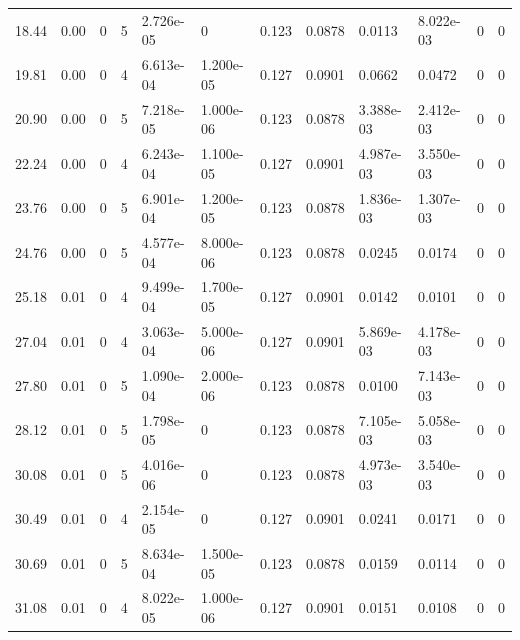 \documentclass[preview]{standalone}
\begin{document}
{{\begin{tabular}{L{1.2cm}C{1.2cm} C{0.3cm}C{0.5cm} C{1.4cm}C{1.4cm} C{1.4cm}C{1.4cm} C{1.6cm}C{1.6cm} C{1.6cm}C{1.6cm}}
  18.44  &  0.00  & 0     &  5 &  2.726e-05  & 0  &  0.123&   0.0878& 0.0113 & 8.022e-03   &  0 & 0  \\ 
  19.81  &  0.00  & 0     &  4 &  6.613e-04  & 1.200e-05  &  0.127&   0.0901& 0.0662 & 0.0472   &  0 & 0  \\ 
  20.90  &  0.00  & 0     &  5 &  7.218e-05  & 1.000e-06  &  0.123&   0.0878& 3.388e-03 & 2.412e-03   &  0 & 0  \\ 
  22.24  &  0.00  & 0     &  4 &  6.243e-04  & 1.100e-05  &  0.127&   0.0901& 4.987e-03 & 3.550e-03   &  0 & 0  \\ 
  23.76  &  0.00  & 0     &  5 &  6.901e-04  & 1.200e-05  &  0.123&   0.0878& 1.836e-03 & 1.307e-03   &  0 & 0  \\ 
  24.76  &  0.00  & 0     &  5 &  4.577e-04  & 8.000e-06  &  0.123&   0.0878& 0.0245 & 0.0174   &  0 & 0  \\ 
  25.18  &  0.01  & 0     &  4 &  9.499e-04  & 1.700e-05  &  0.127&   0.0901& 0.0142 & 0.0101   &  0 & 0  \\ 
  27.04  &  0.01  & 0     &  4 &  3.063e-04  & 5.000e-06  &  0.127&   0.0901& 5.869e-03 & 4.178e-03   &  0 & 0  \\ 
  27.80  &  0.01  & 0     &  5 &  1.090e-04  & 2.000e-06  &  0.123&   0.0878& 0.0100 & 7.143e-03   &  0 & 0  \\ 
  28.12  &  0.01  & 0     &  5 &  1.798e-05  & 0  &  0.123&   0.0878& 7.105e-03 & 5.058e-03   &  0 & 0  \\ 
  30.08  &  0.01  & 0     &  5 &  4.016e-06  & 0  &  0.123&   0.0878& 4.973e-03 & 3.540e-03   &  0 & 0  \\ 
  30.49  &  0.01  & 0     &  4 &  2.154e-05  & 0  &  0.127&   0.0901& 0.0241 & 0.0171   &  0 & 0  \\ 
  30.69  &  0.01  & 0     &  5 &  8.634e-04  & 1.500e-05  &  0.123&   0.0878& 0.0159 & 0.0114   &  0 & 0  \\ 
  31.08  &  0.01  & 0     &  4 &  8.022e-05  & 1.000e-06  &  0.127&   0.0901& 0.0151 & 0.0108   &  0 & 0  \\ 
\hline 
\end{tabular} 

}}
\end{document}
